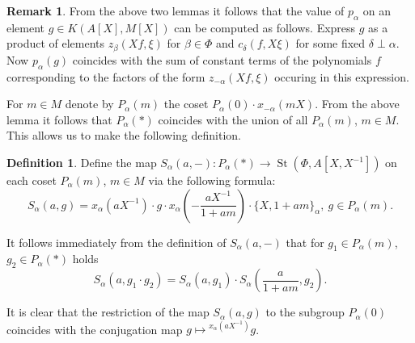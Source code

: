 \documentclass[oneside, 8pt]{amsart}
\theoremstyle{remark}
\theoremstyle{definition}
\newtheorem{df}[lemma]{Definition} \Crefname{df}{Definition}{Definitions}
\newtheorem{rem}[lemma]{Remark}
\DeclareMathOperator{\St}{St}
\numberwithin{equation}{section}
\begin{document}
\begin{rem} \label{rem:palpha} From the above two lemmas it follows that the value of $p_\alpha$ on an element $g\in K(A[X], M[X])$ can be computed as follows. Express $g$ as a product of elements $z_{\beta}(Xf, \xi)$ for $\beta \in \Phi$ and $c_\delta(f, X\xi)$ for some fixed $\delta \perp \alpha$. Now $p_\alpha(g)$ coincides with the sum of constant terms of the polynomials $f$ corresponding to the factors of the form $z_{-\alpha}(Xf, \xi)$ occuring in this expression. \end{rem}


For $m \in M$ denote by $P_\alpha(m)$ the coset $P_\alpha(0) \cdot x_{-\alpha}(mX)$.
From the above lemma it follows that $P_\alpha(*)$ coincides with the union of all $P_\alpha(m)$, $m\in M$. This allows us to make the following definition. 

\begin{df} Define the map $S_\alpha(a, -) \colon P_\alpha(*) \to \St(\Phi, A[X, X^{-1}])$ on each coset $P_\alpha(m)$, $m \in M$ via the following formula:
\[ S_\alpha(a, g) = x_\alpha(aX^{-1})\cdot g \cdot x_\alpha\left(-\frac{aX^{-1}}{1 + am}\right) \cdot \{X, 1+ am\}_\alpha,\ g \in P_\alpha(m).\] \end{df}
It follows immediately from the definition of $S_\alpha(a, -)$ that for $g_1 \in P_\alpha(m)$, $g_2 \in P_\alpha(*)$ holds
\[ S_\alpha(a, g_1\cdot g_2) = S_\alpha(a, g_1) \cdot S_\alpha\left(\frac{a}{1+am}, g_2\right).\]

It is clear that the restriction of the map $S_\alpha(a, g)$ to the subgroup $P_\alpha(0)$ coincides with the conjugation map $g \mapsto {}^{x_\alpha(aX^{-1})}\!g$.
\end{document}

